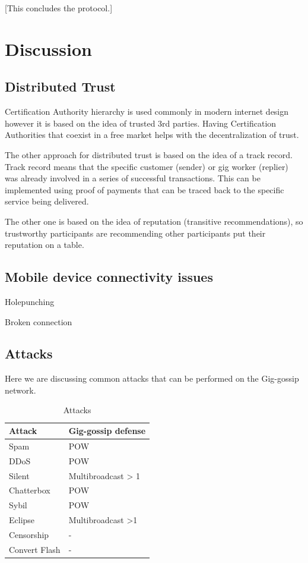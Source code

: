 \documentclass{article}
\begin{document}
[This concludes the protocol.]

\section{Discussion}

\subsection{Distributed Trust}

Certification Authority hierarchy is used commonly in modern internet design however it is based on the idea of trusted 3rd parties. Having Certification Authorities that coexist in a free market helps with the decentralization of trust.

The other approach for distributed trust is based on the idea of a track record. Track record means that the specific customer (sender) or gig worker (replier) was already involved in a series of successful transactions. This can be implemented using proof of payments that can be traced back to the specific service being delivered.

The other one is based on the idea of reputation (transitive recommendations), so trustworthy participants are recommending other participants put their reputation on a table.

\subsection{Mobile device connectivity issues}

Holepunching \cite{HolePunching}

Broken connection

\subsection{Attacks}
Here we are discussing common attacks that can be performed on the Gig-gossip network.


\begin{table}  
	\centering
	\begin{tabular}{ll}
		\toprule
		Attack         & Gig-gossip defense \\
		\midrule
		Spam           & POW \\
		DDoS           & POW \\
		Silent         & Multibroadcast > 1 \\
		Chatterbox     & POW \\
		Sybil          & POW \\
		Eclipse        & Multibroadcast >1 \\
		Censorship     & - \\
		Convert Flash  & - \\
		\bottomrule
	\end{tabular}
	\label{tab:attacks}
	\caption{Attacks}
\end{table}
\end{document}
